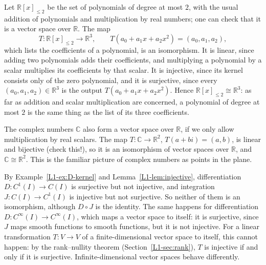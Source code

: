 \begin{example}\label{L1-ex:iso-poly}
    Let $\mathbb{R}[x]_{\leq 2}$ be the set of polynomials of degree at most $2$, with the usual addition of polynomials and multiplication by real numbers; one can check that it is a vector space over $\mathbb{R}$. The map
    \[T: \mathbb{R}[x]_{\leq 2} \to \mathbb{R}^3, \qquad T(a_0 + a_1 x + a_2 x^2) = (a_0, a_1, a_2),\]
    which lists the coefficients of a polynomial, is an isomorphism. It is linear, since adding two polynomials adds their coefficients, and multiplying a polynomial by a scalar multiplies its coefficients by that scalar. It is injective, since its kernel consists only of the zero polynomial, and it is surjective, since every $(a_0, a_1, a_2) \in \mathbb{R}^3$ is the output $T(a_0 + a_1 x + a_2 x^2)$. Hence $\mathbb{R}[x]_{\leq 2} \cong \mathbb{R}^3$: as far as addition and scalar multiplication are concerned, a polynomial of degree at most $2$ is the same thing as the list of its three coefficients.
\end{example}

\begin{example}
    The complex numbers $\mathbb{C}$ also form a vector space over $\mathbb{R}$, if we only allow multiplication by real scalars. The map $T: \mathbb{C} \to \mathbb{R}^2$, $T(a + bi) = (a, b)$, is linear and bijective (check this!), so it is an isomorphism of vector spaces over $\mathbb{R}$, and $\mathbb{C} \cong \mathbb{R}^2$. This is the familiar picture of complex numbers as points in the plane.
\end{example}

\begin{example}\label{L1-ex:D-not-iso}
    By Example~\ref{L1-ex:D-kernel} and Lemma~\ref{L1-lem:injective}, differentiation $D: C^1(I) \to C(I)$ is surjective but not injective, and integration $J: C(I) \to C^1(I)$ is injective but not surjective. So neither of them is an isomorphism, although $D \circ J$ is the identity. The same happens for differentiation $D: C^\infty(I) \to C^\infty(I)$, which maps a vector space to itself: it is surjective, since $J$ maps smooth functions to smooth functions, but it is not injective. For a linear transformation $T: V \to V$ of a finite-dimensional vector space to itself, this cannot happen: by the rank--nullity theorem (Section~\ref{L1-sec:rank}), $T$ is injective if and only if it is surjective. Infinite-dimensional vector spaces behave differently.
\end{example}

